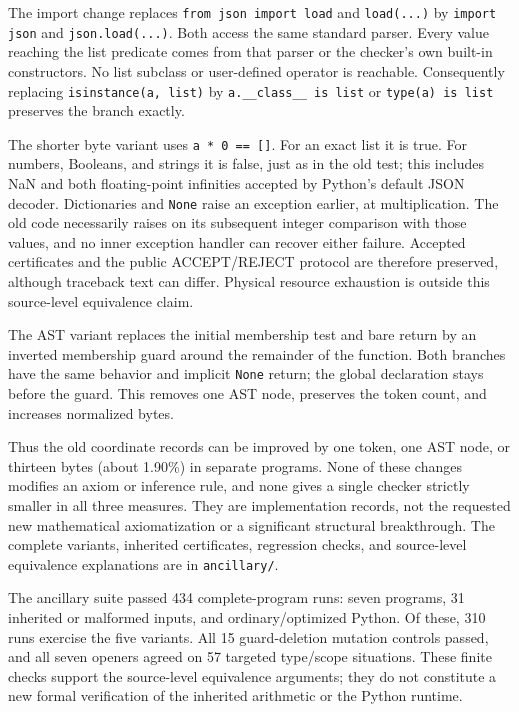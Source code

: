 \documentclass[11pt,letterpaper]{article}
\theoremstyle{definition}\newtheorem{definition}[theorem]{Definition}
\theoremstyle{remark}\newtheorem{remark}[theorem]{Remark}
\newcommand{\file}[1]{{\small\nolinkurl{#1}}}
\begin{document}
The import change replaces \texttt{from json import load} and
\texttt{load(...)} by \texttt{import json} and \texttt{json.load(...)}.
Both access the same standard parser. Every value reaching the list
predicate comes from that parser or the checker's own built-in
constructors. No list subclass or user-defined operator is reachable.
Consequently replacing \texttt{isinstance(a, list)} by
\texttt{a.\_\_class\_\_ is list} or \texttt{type(a) is list}
preserves the branch exactly.

The shorter byte variant uses \texttt{a * 0 == []}. For an exact list it
is true. For numbers, Booleans, and strings it is false, just as in the
old test; this includes NaN and both floating-point infinities accepted
by Python's default JSON decoder. Dictionaries and \texttt{None} raise
an exception earlier, at multiplication. The old code necessarily raises
on its subsequent integer comparison with those values, and no inner
exception handler can recover either failure. Accepted certificates and
the public ACCEPT/REJECT protocol are therefore preserved, although
traceback text can differ. Physical resource exhaustion is outside
this source-level equivalence claim.

The AST variant replaces the initial membership test and bare return
by an inverted membership guard around the remainder of the function.
Both branches have the same behavior and implicit \texttt{None} return;
the global declaration stays before the guard. This removes one AST
node, preserves the token count, and increases normalized bytes.

Thus the old coordinate records can be improved by one token, one AST
node, or thirteen bytes (about 1.90\%) in separate programs. None of
these changes modifies an axiom or inference rule, and none gives a
single checker strictly smaller in all three measures. They are
implementation records, not the requested new mathematical
axiomatization or a significant structural breakthrough. The complete
variants, inherited certificates, regression checks, and source-level
equivalence explanations are in \file{ancillary/}.

The ancillary suite passed 434 complete-program runs: seven programs,
31 inherited or malformed inputs, and ordinary/optimized Python.
Of these, 310 runs exercise the five variants. All 15 guard-deletion
mutation controls passed, and all seven openers agreed on 57 targeted
type/scope situations. These finite checks support the source-level
equivalence arguments; they do not constitute a new formal verification
of the inherited arithmetic or the Python runtime.
\end{document}
